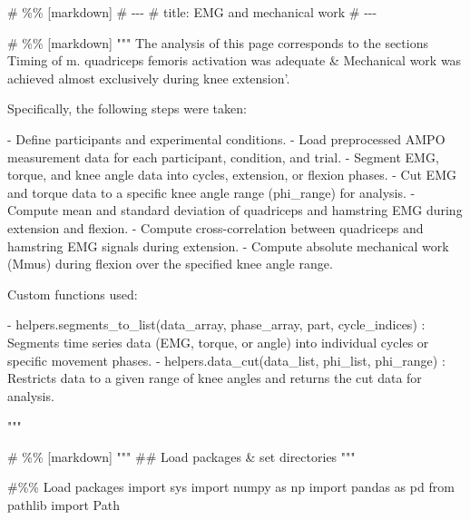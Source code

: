 \documentclass[
  11pt,
  a4paper]{article}
\newenvironment{Shaded}{\begin{snugshade}}{\end{snugshade}}
\newcommand{\CommentTok}[1]{\textcolor[rgb]{0.37,0.37,0.37}{#1}}
\newcommand{\ImportTok}[1]{\textcolor[rgb]{0.00,0.46,0.62}{#1}}
\newcommand{\NormalTok}[1]{\textcolor[rgb]{0.00,0.23,0.31}{#1}}
\begin{document}
\begin{Shaded}
\begin{Highlighting}[]
\CommentTok{\# \%\% [markdown]}
\CommentTok{\# {-}{-}{-}}
\CommentTok{\# title: EMG and mechanical work}
\CommentTok{\# {-}{-}{-}}

\CommentTok{\# \%\% [markdown]}
\CommentTok{"""}
\CommentTok{The analysis of this page corresponds to the sections \textquotesingle{}Timing of m. quadriceps }
\CommentTok{femoris activation was adequate\textquotesingle{} \& Mechanical work was achieved almost }
\CommentTok{exclusively during knee extension’.}

\CommentTok{Specifically, the following steps were taken:}

\CommentTok{{-}   Define participants and experimental conditions.}
\CommentTok{{-}   Load preprocessed AMPO measurement data for each participant, condition, and trial.}
\CommentTok{{-}   Segment EMG, torque, and knee angle data into cycles, extension, or flexion phases.}
\CommentTok{{-}   Cut EMG and torque data to a specific knee angle range (phi\_range) for analysis.}
\CommentTok{{-}   Compute mean and standard deviation of quadriceps and hamstring EMG during extension and flexion.}
\CommentTok{{-}   Compute cross{-}correlation between quadriceps and hamstring EMG signals during extension.}
\CommentTok{{-}   Compute absolute mechanical work (Mmus) during flexion over the specified knee angle range.}

\CommentTok{Custom functions used:}

\CommentTok{{-}   \textasciigrave{}helpers.segments\_to\_list(data\_array, phase\_array, part, cycle\_indices)\textasciigrave{}}
\CommentTok{    : Segments time series data (EMG, torque, or angle) into individual cycles or specific movement phases.}
\CommentTok{{-}   \textasciigrave{}helpers.data\_cut(data\_list, phi\_list, phi\_range)\textasciigrave{}}
\CommentTok{    : Restricts data to a given range of knee angles and returns the cut data for analysis.}

\CommentTok{"""}

\CommentTok{\# \%\% [markdown]}
\CommentTok{"""}
\CommentTok{\#\# Load packages \& set directories}
\CommentTok{"""}

\CommentTok{\#\%\% Load packages}
\ImportTok{import}\NormalTok{ sys}
\ImportTok{import}\NormalTok{ numpy }\ImportTok{as}\NormalTok{ np}
\ImportTok{import}\NormalTok{ pandas }\ImportTok{as}\NormalTok{ pd}
\ImportTok{from}\NormalTok{ pathlib }\ImportTok{import}\NormalTok{ Path}


\end{Highlighting}
\end{Shaded}
\end{document}
